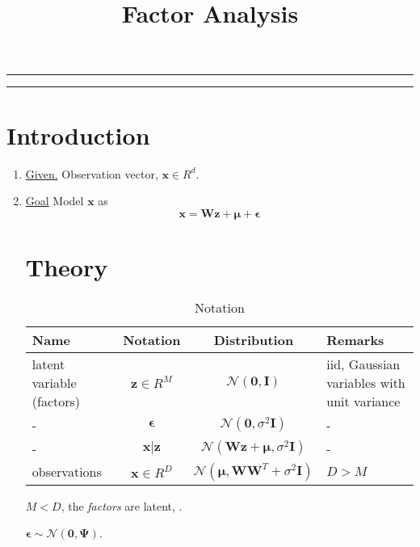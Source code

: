 
\title{Factor Analysis}
\date{}

\maketitle
\rule[0pt]{\textwidth}{1pt}
\tableofcontents
\rule[0pt]{\textwidth}{1pt}

\section{Introduction}

\begin{enumerate}
\item \underline{Given.}  Observation vector, $\mathbf{x}  \in R^d$.
\item \underline{Goal}
Model $\mathbf{x}$ as
\begin{equation}
\mathbf{x} = \mathbf{W}\mathbf{z}+ \mathbf{\mu} + \mathbf{\epsilon}
\end{equation}

\section{Theory}


\begin{table}[h]
\centering
\begin{tabular}{| l | c | c | l |}\hline
\textbf{Name} & \textbf{Notation} & \textbf{Distribution} & \textbf{Remarks}\\\hline
latent variable (factors) & $\mathbf{z} \in R^M$ & $ \mathcal{N}(\mathbf{0},\mathbf{I})$ & \parbox{2in}{iid, Gaussian variables with unit variance}\\\hline
- & $ \mathbf{\epsilon}$ & $ \mathcal{N}(\mathbf{0},\sigma^2\mathbf{I})$ &-\\\hline
- & $\mathbf{x|z} $ & $ \mathcal{N}(\mathbf{Wz+\mu},\sigma^2\mathbf{I})$ &-\\\hline							
observations & $\mathbf{x} \in R^D$ & $ \mathcal{N}(\mathbf{\mu},\mathbf{WW}^T + \sigma^2\mathbf{I})$ &$D>M$ \\\hline
\end{tabular}
\caption{Notation}
\end{table}

 $M<D$, the \emph{factors} are latent, .

$\mathbf{\epsilon}\sim \mathcal{N}(\mathbf{0},\mathbf{\Psi})$.


\end{enumerate}
